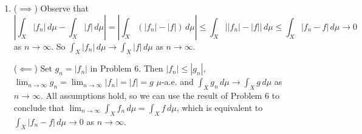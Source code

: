 \documentclass[12pt]{report}
\newcommand{\numl}[1]{\item[\large\textbf{\sffamily #1.}]}
\newcommand{\abs}[1]{\left| #1 \right|}
\newcommand{\paren}[1]{\left( #1 \right)}
\newcommand{\ra}{\rightarrow}
\newcommand{\mimp}{\(\implies\)}
\newcommand{\mimpd}{\(\impliedby\)}
\renewcommand{\d}[1]{\,d{#1}}
\begin{document}
\begin{enumerate}
    \numl{7} (\mimp) Observe that
    \[
        \abs{\int_X \abs{f_n} \d{\mu} - \int_X \abs{f} \d{\mu}} = \abs{\int_X \paren{\abs{f_n} - \abs{f}} \d{\mu}} \leq \int_X \abs{\abs{f_n} - \abs{f}} \d{\mu} \leq \int_X \abs{f_n - f}\d{\mu} \ra 0
    \]
    as \(n \ra \infty\). So \(\int_X \abs{f_n} \d{\mu} \ra \int_X \abs{f} \d{\mu}\) as \(n \ra \infty\).

    (\mimpd) Set \(g_n = \abs{f_n}\) in {\sffamily Problem 6}. Then \(\abs{f_n}\leq \abs{g_n}\), \(\lim_{n \ra \infty} g_n = \lim_{n \ra \infty} \abs{f_n} = \abs{f} = g\) \(\mu\)-a.e. and \(\int_X g_n \d{\mu} \ra \int_X g \d{\mu}\) as \(n \ra \infty\). All assumptions hold, so we can use the result of {\sffamily Problem 6} to conclude that \(\lim_{n \ra \infty} \int_X f_n \d{\mu} = \int_X f \d{\mu}\), which is equivalent to \(\int_X \abs{f_n - f} \d{\mu} \ra 0\) as \(n \ra \infty\).

\end{enumerate}
\end{document}

